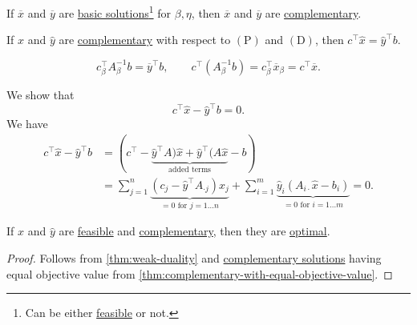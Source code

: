 \begin{theorem}\label{thm:lec10-1}
	If \(\overline{x}\) and \(\overline{y}\) are \hyperref[def:basic-solution]{basic solutions}\footnote{Can be either \hyperref[def:feasible-solution]{feasible} or not.} for \(\beta, \eta\), then \(\overline{x}\) and \(\overline{y}\) are \hyperref[def:complementary]{complementary}.
\end{theorem}

\begin{theorem}\label{thm:complementary-with-equal-objective-value}
	If \(\hat{x}\) and \(\hat{y}\) are \hyperref[def:complementary]{complementary} with respect to \((\mathrm{P})\) and \((\mathrm{D})\), then \(c^{\top}\hat{x} = \hat{y}^{\top} b\).
\end{theorem}
\begin{note}
	\[
		c^{\top}_{\beta} A^{-1}_{\beta}b = \overline{y}^{\top} b,\qquad c^{\top}(A^{-1}_{\beta} b) = c^{\top}_{\beta}\overline{x}_{\beta} = c^{\top}\overline{x}.
	\]
\end{note}
\begin{explanation}
	We show that
	\[
		c^{\top} \hat{x} - \hat{y}^{\top} b = 0.
	\]
	We have
	\[
		\begin{split}
			c^{\top} \hat{x} - \hat{y}^{\top} b &= (c^{\top} - \underbrace{\hat{y}^{\top}A)\hat{x} + \hat{y}^{\top}(A \hat{x}}_{\text{added terms}} - b)\\
			&=\sum\limits_{j=1}^{n} \underbrace{(c_{j}-\hat{y}^{\top}A_{\cdot j})x_{j}}_{ = 0\text{ for } j = 1\dots n}
			+ \sum\limits_{i=1}^{m} \underbrace{\hat{y}_i(A_{i\cdot}\hat{x} - b_{i})}_{ = 0\text{ for } i = 1\dots m}
			= 0.
		\end{split}
	\]
\end{explanation}

\begin{theorem}\label{thm:weak-complementary-slackness-theorem}
	If \(\hat{x}\) and \(\hat{y}\) are \hyperref[def:feasible-solution]{feasible} and \hyperref[def:complementary]{complementary}, then they are \hyperref[def:optimal-solution]{optimal}.
\end{theorem}
\begin{proof}
	Follows from \autoref{thm:weak-duality} and \hyperref[def:complementary]{complementary solutions} having equal objective value from \autoref{thm:complementary-with-equal-objective-value}.
\end{proof}

